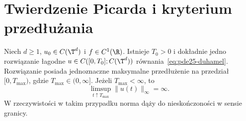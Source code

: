 \section{Twierdzenie Picarda i kryterium przedłużania}
\begin{twierdzenie}
\label{thm:pde25-local}
Niech $d\ge1$, $u_0\in C(\T^d)$ i $f\in C^1(\R)$.
Istnieje $T_0>0$ i dokładnie jedno rozwiązanie łagodne
$u\in C([0,T_0];C(\T^d))$ równania~\eqref{eq:pde25-duhamel}.
Rozwiązanie posiada jednoznaczne maksymalne przedłużenie
na przedział $[0,T_{\max})$, gdzie $T_{\max}\in(0,\infty]$.
Jeżeli $T_{\max}<\infty$, to
\begin{equation}\label{eq:pde25-blowalt}
 \limsup_{t\uparrow T_{\max}}\|u(t)\|_\infty=\infty.
\end{equation}
W rzeczywistości w takim przypadku norma dąży do
nieskończoności w sensie granicy.
\end{twierdzenie}
